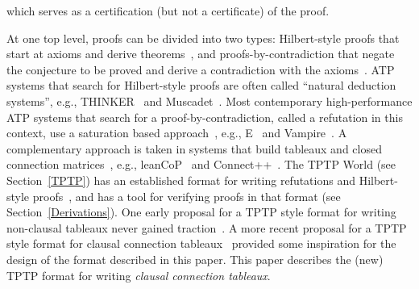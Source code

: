 \documentclass{ceurart}
\begin{document}
which serves as a certification (but not a certificate) of the proof.
%  

At one top level, proofs can be divided into two types: Hilbert-style proofs that start at
axioms and derive theorems~\cite{End72}, and proofs-by-contradiction that negate the
conjecture to be proved and derive a contradiction with the axioms~\cite{Men87}.
ATP systems that search for Hilbert-style proofs are often called ``natural deduction systems'',
e.g., THINKER~\cite{Pel98} and Muscadet~\cite{Pas01-IJCAR}.
Most contemporary high-performance ATP systems that search for a proof-by-contradiction, called
a refutation in this context, use a saturation based approach~\cite{Sch06}, e.g., E~\cite{SCV19} 
and Vampire~\cite{KV13}.
A complementary approach is taken in systems that build tableaux and closed connection 
matrices~\cite{FB+98}, e.g., leanCoP~\cite{Ott23} and Connect++~\cite{Hol23}.
The TPTP World (see Section~\ref{TPTP}) has an established format for writing refutations and
Hilbert-style proofs~\cite{SS+06}, and has a tool for verifying proofs in that format (see
Section~\ref{Derivations}).
One early proposal for a TPTP style format for writing non-clausal tableaux never gained 
traction~\cite{OS10}.
A more recent proposal for a TPTP style format for clausal connection tableaux~\cite{OH23} provided 
some inspiration for the design of the format described in this paper.
This paper describes the (new) TPTP format for writing \emph{clausal connection tableaux}.
\end{document}
